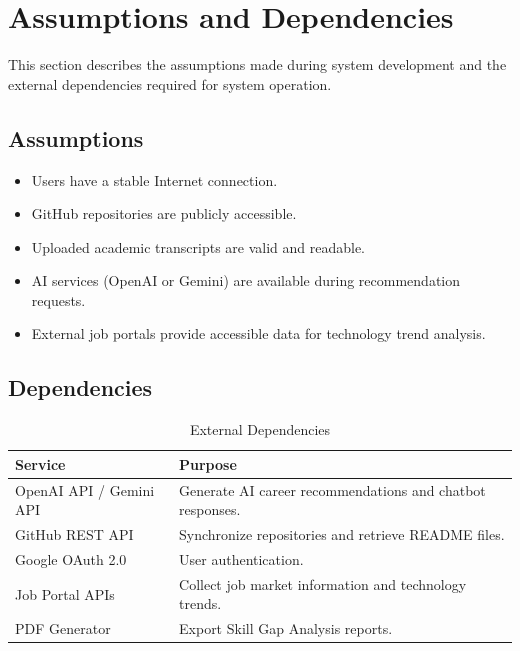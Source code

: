 
\section{Assumptions and Dependencies}

This section describes the assumptions made during system development and the external dependencies required for system operation.

\subsection{Assumptions}

\begin{itemize}
    \item Users have a stable Internet connection.
    \item GitHub repositories are publicly accessible.
    \item Uploaded academic transcripts are valid and readable.
    \item AI services (OpenAI or Gemini) are available during recommendation requests.
    \item External job portals provide accessible data for technology trend analysis.
\end{itemize}

\subsection{Dependencies}

\begin{table}[H]
\centering
\caption{External Dependencies}
\begin{tabular}{|l|p{9cm}|}
\hline
\textbf{Service} & \textbf{Purpose} \\ \hline

OpenAI API / Gemini API &
Generate AI career recommendations and chatbot responses.
\\ \hline

GitHub REST API &
Synchronize repositories and retrieve README files.
\\ \hline

Google OAuth 2.0 &
User authentication.
\\ \hline

Job Portal APIs &
Collect job market information and technology trends.
\\ \hline

PDF Generator &
Export Skill Gap Analysis reports.
\\ \hline

\end{tabular}
\end{table}

